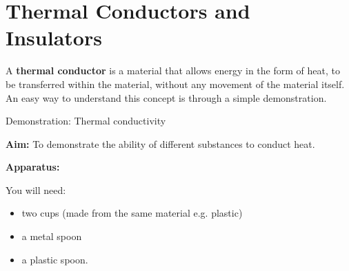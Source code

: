             \section{Thermal Conductors and Insulators}
            \nopagebreak
      \label{m38706*id66527}A \textbf{thermal conductor} is a material that allows energy in the form of heat, to be transferred within the material, without any movement of the material itself. An easy way to understand this concept is through a simple demonstration.\par 
\label{m38706*secfhsst!!!underscore!!!id453}
            \begin{g_experiment}{Demonstration: Thermal conductivity}{
            \nopagebreak
            \label{m38706*id66568}\noindent{}\textbf{Aim: }\newline
    To demonstrate the ability of different substances to conduct heat.\par 
      \label{m38706*id66588}\noindent{}\textbf{Apparatus: }\newline
\begin{minipage}{.5\textwidth}
You will need:
\begin{itemize}
 \item two cups (made from the same material e.g. plastic)
\item a metal spoon
\item a plastic spoon.
\end{itemize} 
\end{minipage}
\begin{minipage}{.5\textwidth}
	\begin{figure}[H] %
    \begin{center}
    \end{center}
 \end{figure} 

\end{minipage}}
\end{g_experiment}
